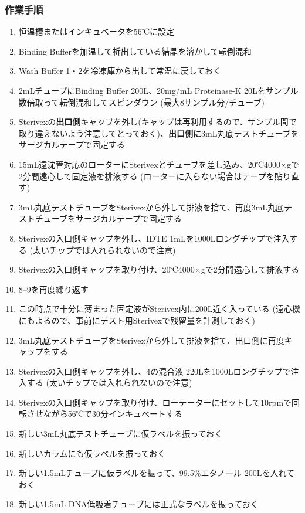 \documentclass[titlepage,10pt,a4paper]{jsbook}
\begin{document}
\subsubsection{作業手順}
\begin{enumerate}
\item 恒温槽またはインキュベータを56℃に設定
\item Binding Bufferを加温して析出している結晶を溶かして転倒混和
\item Wash Buffer 1・2を冷凍庫から出して常温に戻しておく
\item 2mLチューブにBinding Buffer 200{\textmu}L、20mg/mL Proteinase-K 20{\textmu}Lをサンプル数倍取って転倒混和してスピンダウン (最大8サンプル分/チューブ)
\item Sterivexの\textbf{出口側}キャップを外し(キャップは再利用するので、サンプル間で取り違えないよう注意してとっておく)、\textbf{出口側に}3mL丸底テストチューブをサージカルテープで固定する
\item 15mL遠沈管対応のローターにSterivexとチューブを差し込み、20℃4000×gで2分間遠心して固定液を排液する (ローターに入らない場合はテープを貼り直す)
\item 3mL丸底テストチューブをSterivexから外して排液を捨て、再度3mL丸底テストチューブをサージカルテープで固定する
\item Sterivexの入口側キャップを外し、IDTE 1mLを1000{\textmu}Lロングチップで注入する (太いチップでは入れられないので注意)
\item Sterivexの入口側キャップを取り付け、20℃4000×gで2分間遠心して排液する
\item 8--9を再度繰り返す
\item この時点で十分に薄まった固定液がSterivex内に200{\textmu}L近く入っている (遠心機にもよるので、事前にテスト用Sterivexで残留量を計測しておく)
\item 3mL丸底テストチューブをSterivexから外して排液を捨て、出口側に再度キャップをする
\item Sterivexの入口側キャップを外し、4の混合液 220{\textmu}Lを1000{\textmu}Lロングチップで注入する (太いチップでは入れられないので注意)
\item Sterivexの入口側キャップを取り付け、ローテーターにセットして10rpmで回転させながら56℃で30分インキュベートする
\item 新しい3mL丸底テストチューブに仮ラベルを振っておく
\item 新しいカラムにも仮ラベルを振っておく
\item 新しい1.5mLチューブに仮ラベルを振って、99.5\%エタノール 200{\textmu}Lを入れておく
\item 新しい1.5mL DNA低吸着チューブには正式なラベルを振っておく

\end{enumerate}
\end{document}
